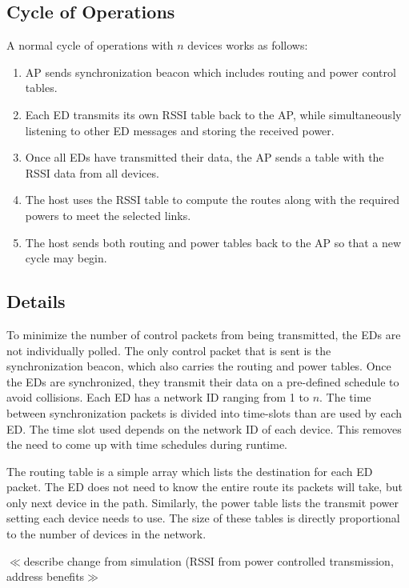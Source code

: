 \documentclass{article}
\begin{document}
\subsection{Cycle of Operations}
A normal cycle of operations with $n$ devices works as follows:
\begin{enumerate}
\item AP sends synchronization beacon which includes routing and power control tables.
\item Each ED transmits its own RSSI table back to the AP, while simultaneously listening to other ED messages and storing the received power.
\item Once all EDs have transmitted their data, the AP sends a table with the RSSI data from all devices.
\item The host uses the RSSI table to compute the routes along with the required powers to meet the selected links.
\item The host sends both routing and power tables back to the AP so that a new cycle may begin.
\end{enumerate}

\subsection{Details}
To minimize the number of control packets from being transmitted, the EDs are not individually polled. The only control packet that is sent is the synchronization beacon, which also carries the routing and power tables. Once the EDs are synchronized, they transmit their data on a pre-defined schedule to avoid collisions. Each ED has a network ID ranging from 1 to $n$. The time between synchronization packets is divided into time-slots than are used by each ED. The time slot used depends on the network ID of each device. This removes the need to come up with time schedules during runtime.

The routing table is a simple array which lists the destination for each ED packet. The ED does not need to know the entire route its packets will take, but only next device in the path. Similarly, the power table lists the transmit power setting each device needs to use. The size of these tables is directly proportional to the number of devices in the network.

$\ll$describe change from simulation (RSSI from power controlled transmission, address benefits$\gg$
\end{document}
